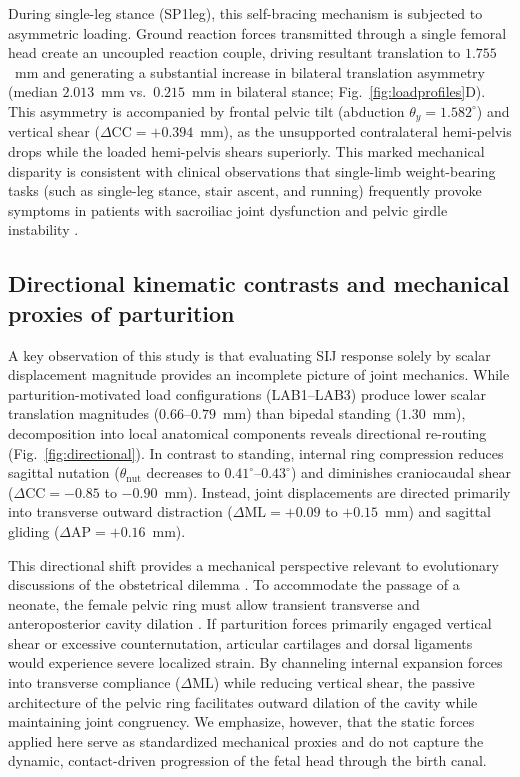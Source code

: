 During single-leg stance (SP1leg), this self-bracing mechanism is subjected to asymmetric loading. Ground reaction forces transmitted through a single femoral head create an uncoupled reaction couple, driving resultant translation to $1.755$~mm and generating a substantial increase in bilateral translation asymmetry (median $2.013$~mm vs.\ $0.215$~mm in bilateral stance; Fig.~\ref{fig:loadprofiles}D). This asymmetry is accompanied by frontal pelvic tilt (abduction $\theta_y = 1.582^\circ$) and vertical shear ($\Delta\text{CC} = +0.394$~mm), as the unsupported contralateral hemi-pelvis drops while the loaded hemi-pelvis shears superiorly. This marked mechanical disparity is consistent with clinical observations that single-limb weight-bearing tasks (such as single-leg stance, stair ascent, and running) frequently provoke symptoms in patients with sacroiliac joint dysfunction and pelvic girdle instability \citep{Goode2008,Hammer2019,Keizer2019}.

\subsection*{Directional kinematic contrasts and mechanical proxies of parturition}
A key observation of this study is that evaluating SIJ response solely by scalar displacement magnitude provides an incomplete picture of joint mechanics. While parturition-motivated load configurations (LAB1--LAB3) produce lower scalar translation magnitudes ($0.66$--$0.79$~mm) than bipedal standing ($1.30$~mm), decomposition into local anatomical components reveals directional re-routing (Fig.~\ref{fig:directional}). In contrast to standing, internal ring compression reduces sagittal nutation ($\theta_{\text{nut}}$ decreases to $0.41^\circ$--$0.43^\circ$) and diminishes craniocaudal shear ($\Delta\text{CC} = -0.85$ to $-0.90$~mm). Instead, joint displacements are directed primarily into transverse outward distraction ($\Delta\text{ML} = +0.09$ to $+0.15$~mm) and sagittal gliding ($\Delta\text{AP} = +0.16$~mm).

This directional shift provides a mechanical perspective relevant to evolutionary discussions of the obstetrical dilemma \citep{Washburn1960,Ruff2017,Pavlicev2020}. To accommodate the passage of a neonate, the female pelvic ring must allow transient transverse and anteroposterior cavity dilation \citep{BiomechPregnancy2022,Fuchs2013PLOS,Almeida2024Uterus}. If parturition forces primarily engaged vertical shear or excessive counternutation, articular cartilages and dorsal ligaments would experience severe localized strain. By channeling internal expansion forces into transverse compliance ($\Delta\text{ML}$) while reducing vertical shear, the passive architecture of the pelvic ring facilitates outward dilation of the cavity while maintaining joint congruency. We emphasize, however, that the static forces applied here serve as standardized mechanical proxies and do not capture the dynamic, contact-driven progression of the fetal head through the birth canal.

